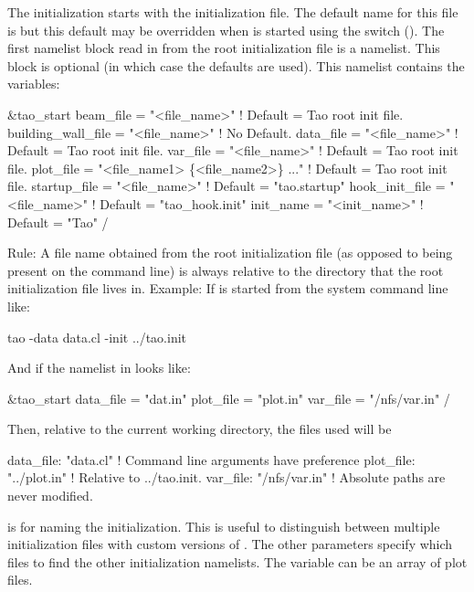 The initialization starts with the  \tao initialization file. The default name for this
file is  but this default may be overridden when \tao is started using the 
switch (). The first namelist block read in from the root initialization file is a
 namelist. This block is optional (in which case the defaults are used).  This
namelist contains the variables:
\begin{example}
  &tao_start
    beam_file          = "<file_name>"  ! Default = Tao root init file.
    building_wall_file = "<file_name>"  ! No Default.
    data_file          = "<file_name>"  ! Default = Tao root init file.
    var_file           = "<file_name>"  ! Default = Tao root init file.
    plot_file          = "<file_name1> \{<file_name2>\} ..."  
                                        ! Default = Tao root init file.
    startup_file       = "<file_name>"  ! Default = "tao.startup"
    hook_init_file     = "<file_name>"  ! Default = "tao_hook.init"
    init_name          = "<init_name>"  ! Default = "Tao"
  /
\end{example}
Rule: A file name obtained from the \tao root initialization file (as opposed to being present on
the command line) is always relative to the directory that the \tao root initialization file lives
in. Example: If \tao is started from the system command line like:
\begin{example}
    tao -data data.cl -init ../tao.init
\end{example}
And if the  namelist in  looks like:
\begin{example}
  &tao_start
    data_file = "dat.in"
    plot_file = "plot.in"
    var_file  = "/nfs/var.in"
  /
\end{example}
Then, relative to the current working directory, the files used will be
\begin{example}
  data_file: "data.cl"      ! Command line arguments have preference
  plot_file: "../plot.in"   ! Relative to ../tao.init.
  var_file:  "/nfs/var.in"  ! Absolute paths are never modified.
\end{example}

 is for naming the initialization. This is useful to distinguish between multiple
initialization files with custom versions of \tao. The other parameters specify which files to find
the other initialization namelists. The  variable can be an array of plot files.

